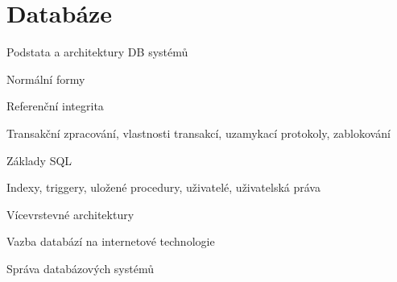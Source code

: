 \section{Databáze}
\begin{pozadavky}
\begin{pitemize}
\item Podstata a architektury DB systémů
\item Normální formy
\item Referenční integrita
\item Transakční zpracování, vlastnosti transakcí, uzamykací protokoly, zablokování
\item Základy SQL
\item Indexy, triggery, uložené procedury, uživatelé, uživatelská práva
\item Vícevrstevné architektury
\item Vazba databází na internetové technologie
\item Správa databázových systémů
\end{pitemize}
\end{pozadavky}










